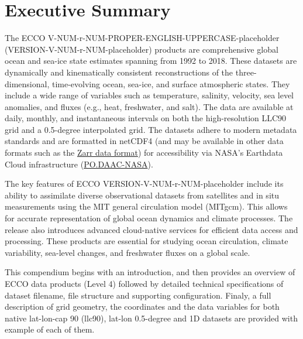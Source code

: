 \pagebreak\section{Executive Summary}
\par \vspace{0.5cm}

The ECCO V-NUM-r-NUM-PROPER-ENGLISH-UPPERCASE-placeholder (VERSION-V-NUM-r-NUM-placeholder) products are comprehensive global ocean and sea-ice state estimates spanning 
from 1992 to 2018. These datasets are dynamically and kinematically consistent reconstructions of the three-dimensional, 
time-evolving ocean, sea-ice, and surface atmospheric states. They include a wide range of variables such as temperature, 
salinity, velocity, sea level anomalies, and fluxes (e.g., heat, freshwater, and salt). The data are available at daily, 
monthly, and instantaneous intervals on both the high-resolution LLC90 grid and a 0.5-degree interpolated grid. The datasets 
adhere to modern metadata standards and are formatted in netCDF4 (and may be available in other data formats such as the
\href{https://en.wikipedia.org/wiki/Zarr_(data_format)}{Zarr data format}) for accessibility via NASA's 
Earthdata Cloud infrastructure (\href{https://podaac.jpl.nasa.gov/}{PO.DAAC-NASA}).

The key features of ECCO VERSION-V-NUM-r-NUM-placeholder include its ability to assimilate diverse observational datasets from satellites 
and in situ measurements using the MIT general circulation model (MITgcm). This allows for accurate representation 
of global ocean dynamics and climate processes. The release also introduces advanced cloud-native services for efficient 
data access and processing. These products are essential for studying ocean circulation, climate variability, sea-level 
changes, and freshwater fluxes on a global scale.

This compendium begins with an introduction, and then provides an
overview of ECCO data products (Level 4) followed by detailed technical specifications of dataset filename, 
file structure and supporting configuration. Finaly, a full description of grid geometry, the coordinates and the 
data variables for both native lat-lon-cap 90 (llc90), lat-lon 0.5-degree and 1D datasets are provided with example of each of them.

